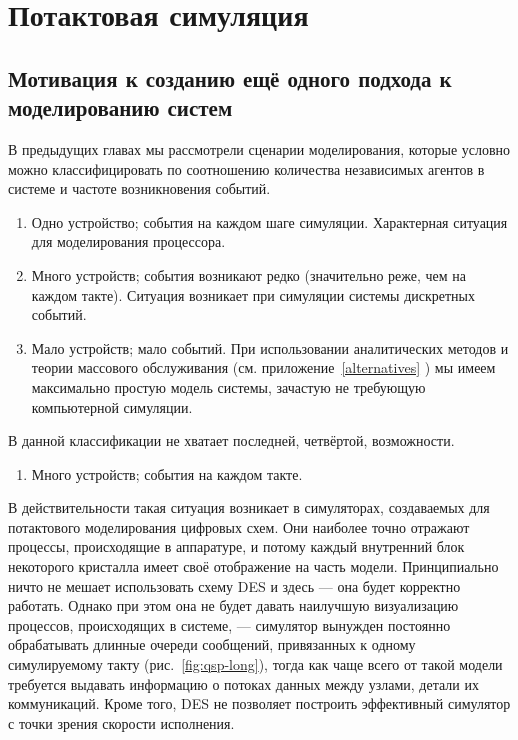 \chapter{Потактовая симуляция}\label{cycle}


\section[Мотивация]{Мотивация к созданию ещё одного подхода к моделированию систем}

В предыдущих главах мы рассмотрели сценарии моделирования, которые условно можно классифицировать по соотношению количества независимых агентов в системе и частоте возникновения событий.

\begin{enumerate}
    \item Одно устройство; события на каждом шаге симуляции. Характерная ситуация для моделирования процессора.
    \item Много устройств; события возникают редко (значительно реже, чем на каждом такте). Ситуация возникает при симуляции системы дискретных событий.
    \item Мало устройств; мало событий. При использовании аналитических методов и теории массового обслуживания (см. приложение~\ref{alternatives} ) мы имеем максимально простую модель системы, зачастую не требующую компьютерной симуляции.
\end{enumerate}

В данной классификации не хватает последней, четвёртой, возможности.

\begin{enumerate}[resume] %
    \item Много устройств; события на каждом такте.
\end{enumerate}

В действительности такая ситуация возникает в симуляторах, создаваемых для потактового моделирования  цифровых схем. Они наиболее точно отражают процессы, происходящие в аппаратуре, и потому каждый внутренний блок некоторого кристалла имеет своё отображение на часть модели. Принципиально ничто не мешает использовать схему DES и здесь --- она будет корректно работать. Однако при этом она не будет давать наилучшую визуализацию процессов, происходящих в системе, --- симулятор вынужден постоянно обрабатывать длинные очереди сообщений, привязанных к одному симулируемому такту (рис.~\ref{fig:qsp-long}), тогда как чаще всего от такой модели требуется выдавать информацию о потоках данных между узлами, детали их коммуникаций. Кроме того, DES не позволяет построить эффективный симулятор с точки зрения скорости исполнения.

